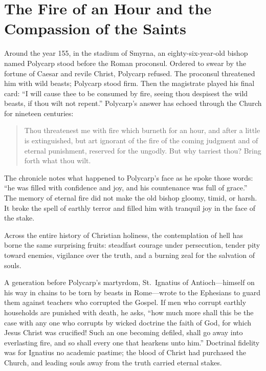 \section{The Fire of an Hour and the Compassion of the Saints}

Around the year 155, in the stadium of Smyrna, an eighty-six-year-old bishop named Polycarp stood before the Roman proconsul. Ordered to swear by the fortune of Caesar and revile Christ, Polycarp refused. The proconsul threatened him with wild beasts; Polycarp stood firm. Then the magistrate played his final card: ``I will cause thee to be consumed by fire, seeing thou despisest the wild beasts, if thou wilt not repent.'' Polycarp's answer has echoed through the Church for nineteen centuries:

\begin{quote}
Thou threatenest me with fire which burneth for an hour, and after a little is extinguished, but art ignorant of the fire of the coming judgment and of eternal punishment, reserved for the ungodly. But why tarriest thou? Bring forth what thou wilt.
\end{quote}

The chronicle notes what happened to Polycarp's face as he spoke those words: ``he was filled with confidence and joy, and his countenance was full of grace.'' The memory of eternal fire did not make the old bishop gloomy, timid, or harsh. It broke the spell of earthly terror and filled him with tranquil joy in the face of the stake.

Across the entire history of Christian holiness, the contemplation of hell has borne the same surprising fruits: steadfast courage under persecution, tender pity toward enemies, vigilance over the truth, and a burning zeal for the salvation of souls.

A generation before Polycarp's martyrdom, St.\ Ignatius of Antioch---himself on his way in chains to be torn by beasts in Rome---wrote to the Ephesians to guard them against teachers who corrupted the Gospel. If men who corrupt earthly households are punished with death, he asks, ``how much more shall this be the case with any one who corrupts by wicked doctrine the faith of God, for which Jesus Christ was crucified! Such an one becoming defiled, shall go away into everlasting fire, and so shall every one that hearkens unto him.'' Doctrinal fidelity was for Ignatius no academic pastime; the blood of Christ had purchased the Church, and leading souls away from the truth carried eternal stakes.

